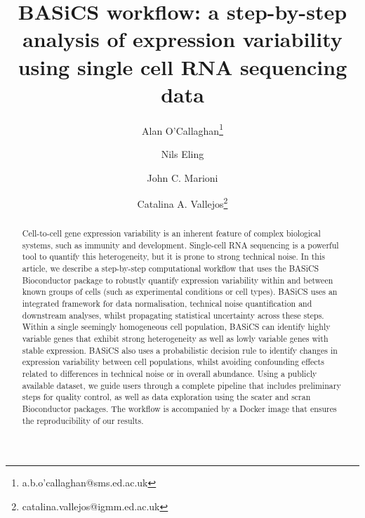 \documentclass[9pt,a4paper,]{extarticle}
\begin{document}
\pagestyle{front}

\title{BASiCS workflow: a step-by-step analysis of expression variability using single cell RNA sequencing data}

\author[1]{Alan O'Callaghan\thanks{\ttfamily a.b.o'callaghan@sms.ed.ac.uk}}
\author[2]{Nils Eling}
\author[3,4]{John C. Marioni}
\author[1,5]{Catalina A. Vallejos\thanks{\ttfamily catalina.vallejos@igmm.ed.ac.uk}}

\maketitle
\thispagestyle{front}

\begin{abstract}
Cell-to-cell gene expression variability is an inherent feature of complex
biological systems, such as immunity and development. Single-cell RNA
sequencing is a powerful tool to quantify this heterogeneity, but it is prone
to strong technical noise. In this article, we describe a step-by-step
computational workflow that uses the BASiCS Bioconductor package to robustly
quantify expression variability within and between known groups of cells (such
as experimental conditions or cell types). BASiCS uses an integrated framework
for data normalisation, technical noise quantification and downstream
analyses, whilst propagating statistical uncertainty across these steps.
Within a single seemingly homogeneous cell population, BASiCS can identify
highly variable genes that exhibit strong heterogeneity as well as lowly
variable genes with stable expression. BASiCS also uses a probabilistic
decision rule to identify changes in expression variability between cell
populations, whilst avoiding confounding effects related to differences in
technical noise or in overall abundance. Using a publicly available
dataset, we guide users through a complete pipeline that includes
preliminary steps for quality control, as well as data exploration
using the scater and scran Bioconductor packages. The workflow is accompanied
by a Docker image that ensures the reproducibility of our results.
\end{abstract}
\end{document}
